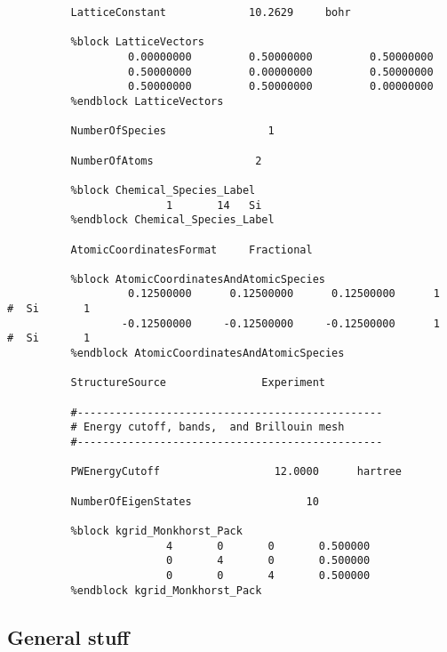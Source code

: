 \documentclass[11pt]{article}
\begin{document}
\begin{verbatim}
          LatticeConstant             10.2629     bohr

          %block LatticeVectors
                   0.00000000         0.50000000         0.50000000
                   0.50000000         0.00000000         0.50000000
                   0.50000000         0.50000000         0.00000000
          %endblock LatticeVectors

          NumberOfSpecies                1

          NumberOfAtoms                2

          %block Chemical_Species_Label
                         1       14   Si
          %endblock Chemical_Species_Label

          AtomicCoordinatesFormat     Fractional

          %block AtomicCoordinatesAndAtomicSpecies
                   0.12500000      0.12500000      0.12500000      1     #  Si       1
                  -0.12500000     -0.12500000     -0.12500000      1     #  Si       1
          %endblock AtomicCoordinatesAndAtomicSpecies

          StructureSource               Experiment

          #------------------------------------------------
          # Energy cutoff, bands,  and Brillouin mesh
          #------------------------------------------------

          PWEnergyCutoff                  12.0000      hartree

          NumberOfEigenStates                  10

          %block kgrid_Monkhorst_Pack
                         4       0       0       0.500000
                         0       4       0       0.500000
                         0       0       4       0.500000
          %endblock kgrid_Monkhorst_Pack
\end{verbatim}




\subsection{General stuff}
\end{document}
